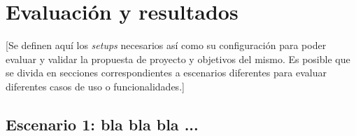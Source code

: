 \chapter{Evaluación y resultados}\label{cap:evaluacion}

[Se definen aquí los \textit{setups} necesarios así como su configuración para poder evaluar y validar la propuesta de proyecto y objetivos del mismo. Es posible que se divida en secciones correspondientes a escenarios diferentes para evaluar diferentes casos de uso o funcionalidades.]

\section{Escenario 1: bla bla bla ...}



